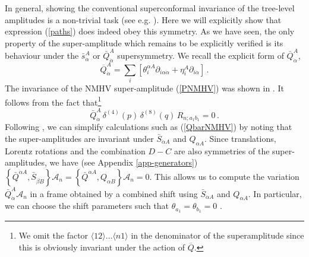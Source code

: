 \documentclass[12pt]{article}
\begin{document}
{In general, showing the conventional superconformal invariance of the
tree-level amplitudes is a non-trivial task (see
e.g. \cite{Witten:2003nn}). Here we will explicitly show that
expression (\ref{paths}) does indeed obey this symmetry.
As we have seen, the only property of the super-amplitude which
remains to be explicitly verified is its behaviour
under the $\bar s^A_{\dot\alpha}$ or $\bar{Q}^{A}_{\dot{\alpha}}$
supersymmetry. We recall the explicit form of $\bar{Q}^{A}_{\dot{\alpha}}$,
\begin{equation}\label{recallQbar}
\overline{Q}_{\dot{\alpha}}^A = \sum_i [\theta_i^{\alpha A}
  \partial_{i \alpha \dot{\alpha}} + \eta_i^A \partial_{i \dot{\alpha}}]\,.
\end{equation}
The invariance of the NMHV super-amplitude (\ref{PNMHV}) was shown in \cite{dhks5}. It follows from the fact that\footnote{We omit the factor $\langle 12 \rangle \ldots \langle n 1 \rangle$ in the denominator of the superamplitude since this is obviously invariant under the action of $\overline{Q}$.}
\begin{equation}\label{QbarNMHV}
\bar{Q}^{A}_{\dot{\alpha}}\, \delta^{(4)}(p)\, \delta^{(8)}(q) \, R_{n;a_{1}b_{1}} = 0\,.
\end{equation}
Following \cite{dhks5}, we can simplify calculations such as (\ref{QbarNMHV})
by noting that the super-amplitudes are invariant under $\bar{S}_{\dot{\alpha} A}$ and $Q_{\alpha A}$.
Since translations, Lorentz rotations and the combination $D-C$ are also symmetries of the super-amplitudes, we have (see Appendix \ref{app-generators})
$\left\{ \bar{Q}^{\dot\alpha A}, \bar{S}_{\dot\beta B} \right\} \mathcal{A}_{n} = \left\{ \bar{Q}^{\dot\alpha A}, {Q}_{\alpha B} \right\} \mathcal{A}_{n} = 0$.
This allows us to compute the variation $\bar{Q}^{A}_{\dot{\alpha}} \mathcal{A}_{n}$ in a frame obtained by a combined shift using $\bar{S}_{\dot{\alpha} A}$ and $Q_{\alpha A}$.
In particular, we can choose the shift parameters such that $\theta_{a_{1}}=\theta_{b_{1}}=0$ \cite{dhks5}.

}
\end{document}
